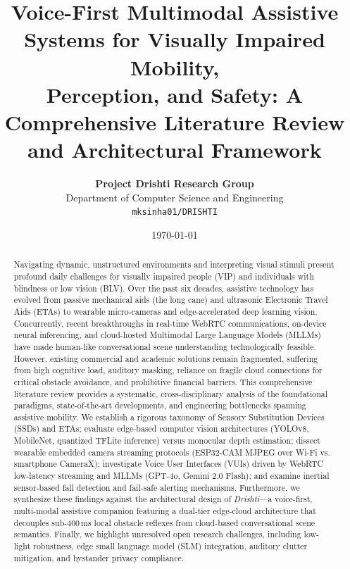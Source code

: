 \documentclass[10pt,twocolumn]{article}
\title{\Large\textbf{Voice-First Multimodal Assistive Systems for Visually Impaired Mobility,\\Perception, and Safety: A Comprehensive Literature Review and Architectural Framework}}
\author{
    \textbf{Project Drishti Research Group} \\
    Department of Computer Science and Engineering \\
    \texttt{mksinha01/DRISHTI}
}
\date{\today}
\begin{document}
\maketitle

\begin{abstract}
Navigating dynamic, unstructured environments and interpreting visual stimuli present profound daily challenges for visually impaired people (VIP) and individuals with blindness or low vision (BLV). Over the past six decades, assistive technology has evolved from passive mechanical aids (the long cane) and ultrasonic Electronic Travel Aids (ETAs) to wearable micro-cameras and edge-accelerated deep learning vision. Concurrently, recent breakthroughs in real-time WebRTC communications, on-device neural inferencing, and cloud-hosted Multimodal Large Language Models (MLLMs) have made human-like conversational scene understanding technologically feasible. However, existing commercial and academic solutions remain fragmented, suffering from high cognitive load, auditory masking, reliance on fragile cloud connections for critical obstacle avoidance, and prohibitive financial barriers. This comprehensive literature review provides a systematic, cross-disciplinary analysis of the foundational paradigms, state-of-the-art developments, and engineering bottlenecks spanning assistive mobility. We establish a rigorous taxonomy of Sensory Substitution Devices (SSDs) and ETAs; evaluate edge-based computer vision architectures (YOLOv8, MobileNet, quantized TFLite inference) versus monocular depth estimation; dissect wearable embedded camera streaming protocols (ESP32-CAM MJPEG over Wi-Fi vs. smartphone CameraX); investigate Voice User Interfaces (VUIs) driven by WebRTC low-latency streaming and MLLMs (GPT-4o, Gemini 2.0 Flash); and examine inertial sensor-based fall detection and fail-safe alerting mechanisms. Furthermore, we synthesize these findings against the architectural design of \textit{Drishti}---a voice-first, multi-modal assistive companion featuring a dual-tier edge-cloud architecture that decouples sub-400\,ms local obstacle reflexes from cloud-based conversational scene semantics. Finally, we highlight unresolved open research challenges, including low-light robustness, edge small language model (SLM) integration, auditory clutter mitigation, and bystander privacy compliance.
\end{abstract}
\end{document}
